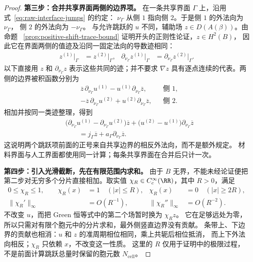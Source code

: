 \begin{proof}
  \smallskip\noindent
  \textbf{第三步：合并共享界面两侧的边界项。}
  在一条共享界面 $\Gamma$ 上，沿用式~\eqref{eq:raw-interface-jumps} 的约定：
  $\nu_\Gamma$ 从侧 $1$ 指向侧 $2$。于是侧 $1$ 的外法向为 $\nu_\Gamma$，
  侧 $2$ 的外法向为 $-\nu_\Gamma$。
  与允许跳跃的 $u$ 不同，辅助场 $z\in D(A(\beta))$。由命题
  ~\ref{prop:positive-shift-trace-bound} 证明开头的正则性论证，$z\in H^2(B)$，
  因此它在界面两侧的值迹及沿同一固定法向的导数迹相同：
  \begin{align*}
    z^{(1)}|_\Gamma&=z^{(2)}|_\Gamma, &
    \partial_{\nu_\Gamma}z^{(1)}|_\Gamma
      &=\partial_{\nu_\Gamma}z^{(2)}|_\Gamma.
  \end{align*}
  以下直接用 $z$ 和 $\partial_{\nu_\Gamma}z$ 表示这些共同的迹；并不要求
  $\nabla z$ 具有逐点连续的代表。两侧的边界被积函数分别为
  \begin{align*}
    &\overline z\,\partial_{\nu_\Gamma}u^{(1)}
      -u^{(1)}\partial_{\nu_\Gamma}\overline z,
      &&\text{侧 $1$},\\
    &-\overline z\,\partial_{\nu_\Gamma}u^{(2)}
      +u^{(2)}\partial_{\nu_\Gamma}\overline z,
      &&\text{侧 $2$}.
  \end{align*}
  相加并按同一类迹整理，得到
  \begin{align*}
    &\bigl(\partial_{\nu_\Gamma}u^{(1)}
        -\partial_{\nu_\Gamma}u^{(2)}\bigr)\overline z
      +\bigl(u^{(2)}-u^{(1)}\bigr)
        \partial_{\nu_\Gamma}\overline z\\
    &\qquad=j_\Gamma\overline z
      +a_\Gamma\partial_{\nu_\Gamma}\overline z.
  \end{align*}
  这说明两个跳跃项前面的正号来自共享边界的相反外法向，而不是额外规定。
  材料界面与人工界面都使用同一计算；每条共享界面在合并后只计一次。

  \smallskip\noindent
  \textbf{第四步：引入光滑截断，先在有限范围内求和。}
  由于 $B$ 无界，不能未经论证便把第二步对无穷多个分片直接相加。取实值
  $\chi_R\in C_c^\infty(\RR)$，其中 $R>0$，满足
  \begin{align*}
    0\leq\chi_R\leq1,\qquad
    \chi_R(x)&=1\quad(|x|\leq R), &
    \chi_R(x)&=0\quad(|x|\geq2R),\\
    \|\chi_R'\|_\infty&=O(R^{-1}), &
    \|\chi_R''\|_\infty&=O(R^{-2}).
  \end{align*}
  不改变 $u$，而把 Green 恒等式中的第二个场暂时换为 $\chi_Rz$。
  它在足够远处为零，所以只需对有限个胞元中的分片求和，最外侧竖直边界没有贡献。
  条带上、下边界的贡献也相消：$u$ 和 $z$ 的准周期相位相同，乘上共轭后相位抵消，
  而上下外法向相反；$\chi_R$ 只依赖 $x$，不改变这一性质。
  这里的 $R$ 仅用于证明中的极限过程，不是前面计算跳跃总量时保留的胞元数
  $N_{\mathrm{cell}}$。


\end{proof}
